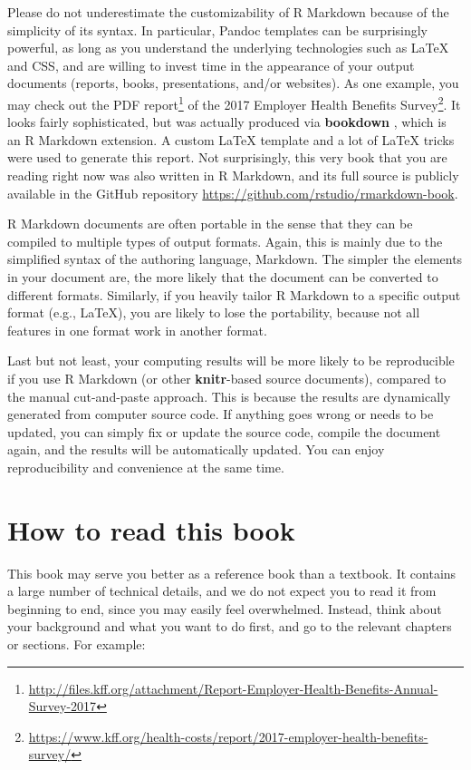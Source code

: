 \documentclass[
  11pt,
]{krantz}
\renewcommand{\href}[2]{#2\footnote{\url{#1}}}
\theoremstyle{definition}
\theoremstyle{definition}
\theoremstyle{definition}
\theoremstyle{definition}
\theoremstyle{remark}
\begin{document}
Please do not underestimate the customizability of R Markdown because of the simplicity of its syntax. In particular, Pandoc templates can be surprisingly powerful, as long as you understand the underlying technologies such as LaTeX and CSS, and are willing to invest time in the appearance of your output documents (reports, books, presentations, and/or websites). As one example, you may check out the \href{http://files.kff.org/attachment/Report-Employer-Health-Benefits-Annual-Survey-2017}{PDF report} of the \href{https://www.kff.org/health-costs/report/2017-employer-health-benefits-survey/}{2017 Employer Health Benefits Survey}. It looks fairly sophisticated, but was actually produced via \textbf{bookdown} \citep{xie2016}, which is an R Markdown extension. A custom LaTeX template and a lot of LaTeX tricks were used to generate this report. Not surprisingly, this very book that you are reading right now was also written in R Markdown, and its full source is publicly available in the GitHub repository \url{https://github.com/rstudio/rmarkdown-book}.

R Markdown documents are often portable in the sense that they can be compiled to multiple types of output formats. Again, this is mainly due to the simplified syntax of the authoring language, Markdown. The simpler the elements in your document are, the more likely that the document can be converted to different formats. Similarly, if you heavily tailor R Markdown to a specific output format (e.g., LaTeX), you are likely to lose the portability, because not all features in one format work in another format.

Last but not least, your computing results will be more likely to be reproducible if you use R Markdown (or other \textbf{knitr}-based source documents), compared to the manual cut-and-paste approach. This is because the results are dynamically generated from computer source code. If anything goes wrong or needs to be updated, you can simply fix or update the source code, compile the document again, and the results will be automatically updated. You can enjoy reproducibility and convenience at the same time.

\hypertarget{how-to-read-this-book}{%
\section*{How to read this book}\label{how-to-read-this-book}}


This book may serve you better as a reference book than a textbook. It contains a large number of technical details, and we do not expect you to read it from beginning to end, since you may easily feel overwhelmed. Instead, think about your background and what you want to do first, and go to the relevant chapters or sections. For example:
\end{document}
